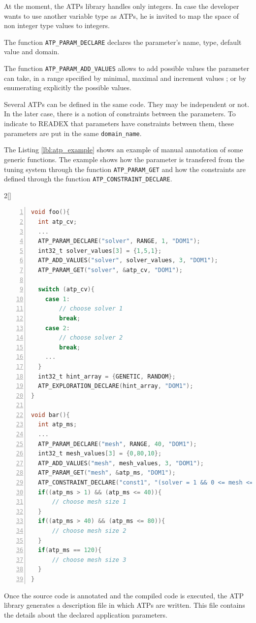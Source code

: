 At the moment, the ATPs library handles only integers. In case the developer wants to use another variable 
type as ATPs, he is invited to map the space of non integer type values to integers.

The function \texttt{ATP\_PARAM\_DECLARE} declares the parameter's name, type, default value and domain.

The function \texttt{ATP\_PARAM\_ADD\_VALUES} allows to add possible values the parameter can take, in a range specified by 
minimal, maximal and increment values ; or by enumerating explicitly the possible values.

Several ATPs can be defined in the same code. They may be independent or not. In the later case, there is a 
notion of constraints between the parameters. To indicate to READEX that parameters have constraints between them, 
these parameters are put in the same \texttt{domain\_name}.

The Listing \ref{lbl:atp_example} shows an example of manual annotation of some generic functions. The example shows how 
the parameter is transfered from the tuning system through the function \texttt{ATP\_PARAM\_GET} and how the constraints are 
defined through the function \texttt{ATP\_CONSTRAINT\_DECLARE}.

\begin{minipage}{\linewidth}
\begin{multicols}{2}[]
\begin{lstlisting}[language=C,numbers=left,numberstyle=\tiny,xleftmargin=3em,frame=none,title=\phantom{xxx},label=lbl:atp_example]
void foo(){
  int atp_cv;
  ...
  ATP_PARAM_DECLARE("solver", RANGE, 1, "DOM1");
  int32_t solver_values[3] = {1,5,1};
  ATP_ADD_VALUES("solver", solver_values, 3, "DOM1");
  ATP_PARAM_GET("solver", &atp_cv, "DOM1");

  switch (atp_cv){
    case 1:
        // choose solver 1
        break;
    case 2:
        // choose solver 2
        break;
    ...
  }
  int32_t hint_array = {GENETIC, RANDOM};
  ATP_EXPLORATION_DECLARE(hint_array, "DOM1");
}

void bar(){
  int atp_ms;
  ...
  ATP_PARAM_DECLARE("mesh", RANGE, 40, "DOM1");
  int32_t mesh_values[3] = {0,80,10};
  ATP_ADD_VALUES("mesh", mesh_values, 3, "DOM1");
  ATP_PARAM_GET("mesh", &atp_ms, "DOM1");
  ATP_CONSTRAINT_DECLARE("const1", "(solver = 1 && 0 <= mesh <= 40) || (solver = 2 && 40 <= mesh <= 80) || (solver > 2 && mesh = 120)", "DOM1");
  if((atp_ms > 1) && (atp_ms <= 40)){
      // choose mesh size 1
  }
  if((atp_ms > 40) && (atp_ms <= 80)){
      // choose mesh size 2
  }
  if(atp_ms == 120){
      // choose mesh size 3
  }
}
\end{lstlisting}
\end{multicols}
\end{minipage}
\vspace{0.4cm}
Once the source code is annotated and the compiled code is executed, the ATP library generates a description file in which 
ATPs are written. This file contains the details about the declared application parameters.

